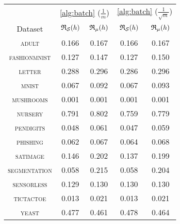 \begin{tabular}{c|cc|cc}
\toprule
 & \multicolumn{2}{c}{\cref{alg:batch} {\small ($\frac{1}{m}$)}} & \multicolumn{2}{c}{\cref{alg:batch} {\small ($\frac{1}{\sqrt{m}}$)}} \\
Dataset & {\scriptsize $\mathfrak{R}_{\mathcal{S}}(h)$} & {\scriptsize $\mathfrak{R}_{\mu}(h)$} & {\scriptsize $\mathfrak{R}_{\mathcal{S}}(h)$} & {\scriptsize $\mathfrak{R}_{\mu}(h)$} \\
\midrule
\textsc{\footnotesize adult} & 0.166 & 0.167 & 0.166 & 0.167 \\
\textsc{\footnotesize fashionmnist} & 0.127 & 0.147 & 0.127 & 0.150 \\
\textsc{\footnotesize letter} & 0.288 & 0.296 & 0.286 & 0.296 \\
\textsc{\footnotesize mnist} & 0.067 & 0.092 & 0.067 & 0.093 \\
\textsc{\footnotesize mushrooms} & 0.001 & 0.001 & 0.001 & 0.001 \\
\textsc{\footnotesize nursery} & 0.791 & 0.802 & 0.759 & 0.779 \\
\textsc{\footnotesize pendigits} & 0.048 & 0.061 & 0.047 & 0.059 \\
\textsc{\footnotesize phishing} & 0.062 & 0.067 & 0.064 & 0.068 \\
\textsc{\footnotesize satimage} & 0.146 & 0.202 & 0.137 & 0.199 \\
\textsc{\footnotesize segmentation} & 0.058 & 0.215 & 0.058 & 0.204 \\
\textsc{\footnotesize sensorless} & 0.129 & 0.130 & 0.130 & 0.130 \\
\textsc{\footnotesize tictactoe} & 0.013 & 0.021 & 0.013 & 0.021 \\
\textsc{\footnotesize yeast} & 0.477 & 0.461 & 0.478 & 0.464 \\
\bottomrule
\end{tabular}
